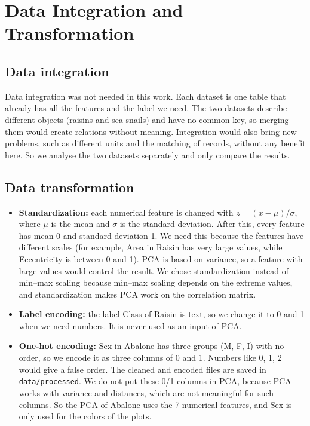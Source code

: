 \documentclass[11pt,a4paper]{article}
\begin{document}
\FloatBarrier
\section{Data Integration and Transformation}
\subsection{Data integration}
Data integration was not needed in this work. Each dataset is one table that already has all the features and the label we need. The two datasets describe different objects (raisins and sea snails) and have no common key, so merging them would create relations without meaning. Integration would also bring new problems, such as different units and the matching of records, without any benefit here. So we analyse the two datasets separately and only compare the results.

\subsection{Data transformation}
\begin{itemize}
  \item \textbf{Standardization:} each numerical feature is changed with $z = (x-\mu)/\sigma$, where $\mu$ is the mean and $\sigma$ is the standard deviation. After this, every feature has mean 0 and standard deviation 1. We need this because the features have different scales (for example, Area in Raisin has very large values, while Eccentricity is between 0 and 1). PCA is based on variance, so a feature with large values would control the result. We chose standardization instead of min--max scaling because min--max scaling depends on the extreme values, and standardization makes PCA work on the correlation matrix.
  \item \textbf{Label encoding:} the label Class of Raisin is text, so we change it to 0 and 1 when we need numbers. It is never used as an input of PCA.
  \item \textbf{One-hot encoding:} Sex in Abalone has three groups (M, F, I) with no order, so we encode it as three columns of 0 and 1. Numbers like 0, 1, 2 would give a false order. The cleaned and encoded files are saved in \texttt{data/processed}. We do not put these 0/1 columns in PCA, because PCA works with variance and distances, which are not meaningful for such columns. So the PCA of Abalone uses the 7 numerical features, and Sex is only used for the colors of the plots.
\end{itemize}
\end{document}
